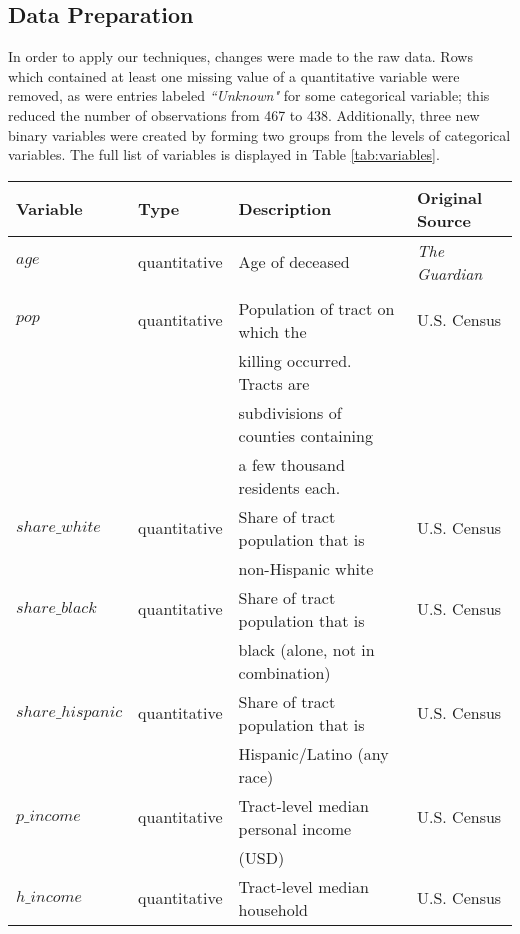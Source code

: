 \subsection{Data Preparation}

\par In order to apply our techniques, changes were made to the raw data. Rows which contained at least one missing value of a quantitative variable were removed, as were entries labeled \textit{``Unknown"} for some categorical variable; this reduced the number of observations from 467 to 438. Additionally, three new binary variables were created by forming two groups from the levels of categorical variables. The full list of variables is displayed in Table \ref{tab:variables}.

\begin{table}[h]
    \centering
    \begin{tabular}{|l|l|l|l|}
        \hline
        \textbf{Variable} & \textbf{Type} & \textbf{Description} & \textbf{Original Source}\\
        \hline
        $age$ & quantitative & Age of deceased & \textit{The Guardian}\\
        &&&\\
        \hline
        $pop$ & quantitative & Population of tract on which the & U.S. Census\\
        && killing occurred. Tracts are &\\
        && subdivisions of counties containing &\\ && a few thousand residents each. &\\
        \hline
        $share\_white$ & quantitative & Share of tract population that is & U.S. Census\\
        && non-Hispanic white &\\
        \hline
        $share\_black$ & quantitative & Share of tract population that is & U.S. Census\\
        && black (alone, not in combination) &\\
        \hline
        $share\_hispanic$ & quantitative & Share of tract population that is & U.S. Census\\
        && Hispanic/Latino (any race) &\\
        \hline
        $p\_income$ & quantitative & Tract-level median personal income & U.S. Census\\
        && (USD) &\\
        \hline
        $h\_income$ & quantitative & Tract-level median household & U.S. Census\\

\end{tabular}
\end{table}
